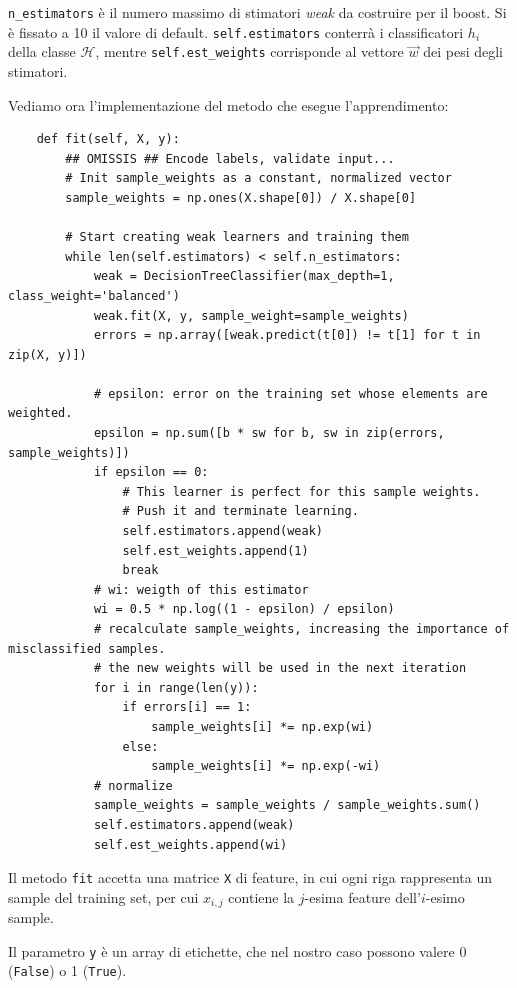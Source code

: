 \documentclass[12pt,a4paper,oneside,hidelinks]{report}
\begin{document}
\texttt{n\_estimators} è il numero massimo di stimatori \textit{weak} da costruire per il boost. Si è fissato a 10 il valore di default. 
\texttt{self.estimators} conterrà i classificatori $ h_{i} $ della classe $ \mathcal{H} $, mentre \texttt{self.est\_weights} corrisponde al vettore $ \vec{w} $ dei pesi degli stimatori.

Vediamo ora l'implementazione del metodo che esegue l'apprendimento:
\begin{lstlisting}
    def fit(self, X, y):
        ## OMISSIS ## Encode labels, validate input...
        # Init sample_weights as a constant, normalized vector
        sample_weights = np.ones(X.shape[0]) / X.shape[0]
        
        # Start creating weak learners and training them
        while len(self.estimators) < self.n_estimators:
            weak = DecisionTreeClassifier(max_depth=1, class_weight='balanced')
            weak.fit(X, y, sample_weight=sample_weights)
            errors = np.array([weak.predict(t[0]) != t[1] for t in zip(X, y)])
            
            # epsilon: error on the training set whose elements are weighted.
            epsilon = np.sum([b * sw for b, sw in zip(errors, sample_weights)])
            if epsilon == 0:
                # This learner is perfect for this sample weights.
                # Push it and terminate learning.
                self.estimators.append(weak)
                self.est_weights.append(1)
                break
            # wi: weigth of this estimator
            wi = 0.5 * np.log((1 - epsilon) / epsilon)
            # recalculate sample_weights, increasing the importance of misclassified samples.
            # the new weights will be used in the next iteration
            for i in range(len(y)):
                if errors[i] == 1:
                    sample_weights[i] *= np.exp(wi)
                else:
                    sample_weights[i] *= np.exp(-wi)
            # normalize
            sample_weights = sample_weights / sample_weights.sum()
            self.estimators.append(weak)
            self.est_weights.append(wi)
\end{lstlisting}

Il metodo \texttt{fit} accetta una matrice \texttt{X} di feature, in cui ogni riga rappresenta un sample del training set, per cui $ x_{i,j} $ contiene la $ j $-esima feature dell'$ i $-esimo sample.

Il parametro \texttt{y} è un array di etichette, che nel nostro caso possono valere 0 (\texttt{False}) o 1 (\texttt{True}).
\end{document}
